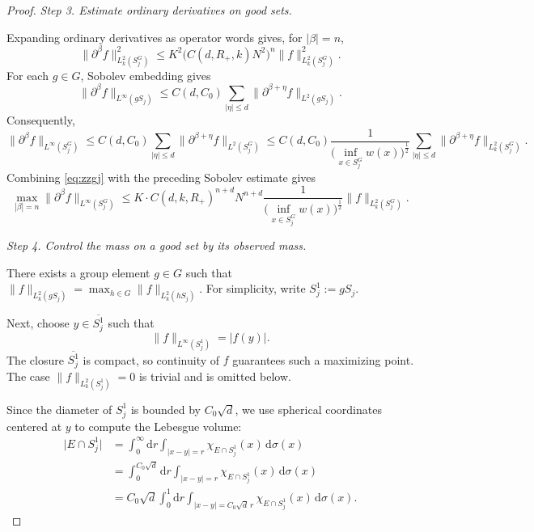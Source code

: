 \documentclass[12pt]{article}
\begin{document}
\begin{proof}
\emph{Step 3. Estimate ordinary derivatives on good sets.}

Expanding ordinary derivatives as operator words gives, for $|\beta|=n$,
\begin{equation}\label{eq:zzgj}
\|\partial^\beta f\|_{L_k^2(S_j^G)}^2 \le K^2\big(C(d,R_+,k)N^2\big)^n \| f\|_{L_k^2(S_j^G)}^2.
\end{equation}
For each $g\in G$, Sobolev embedding gives
\[
\|\partial^\beta f\|_{L^\infty(gS_j)} \le C(d,C_0)\sum_{|\eta|\le d}\|\partial^{\beta+\eta} f\|_{L^2(gS_j)}.
\]
Consequently,
\[
\|\partial^\beta f\|_{L^\infty(S_j^G)} \le C(d,C_0)\sum_{|\eta|\le d}\|\partial^{\beta+\eta} f\|_{L^2(S_j^G)}
\le C(d,C_0)\frac{1}{\big(\inf_{x\in S_j^G} w(x)\big)^{\frac12}}\sum_{|\eta|\le d}\|\partial^{\beta+\eta} f\|_{L_k^2(S_j^G)}.
\]
Combining \eqref{eq:zzgj} with the preceding Sobolev estimate gives
\begin{equation}\label{ESB}
\max_{|\beta|=n}\|\partial^\beta f\|_{L^\infty(S_j^G)} \le K\cdot C(d,k,R_+)^{n+d} N^{n+d}
\frac{1}{\big(\inf_{x\in S_j^G} w(x)\big)^{\frac12}}
\|f\|_{L_k^2(S_j^G)}.
\end{equation}

\emph{Step 4. Control the mass on a good set by its observed mass.}

There exists a group element $g \in G$ such that $\|f\|_{L_k^2(g S_j)} = \max_{h \in G} \|f\|_{L_k^2(h S_j)}$. For simplicity, write $S_j^1 := g S_j$.

Next, choose $y \in \overline{S_j^1}$ such that
\[
\|f\|_{L^\infty(S_j^1)} = |f(y)|.
\]
The closure $\overline{S_j^1}$ is compact, so continuity of $f$ guarantees such a maximizing point. The case $\|f\|_{L_k^2(S_j^1)}=0$ is trivial and is omitted below.

Since the diameter of $S_j^1$ is bounded by $C_0 \sqrt{d}$, we use spherical coordinates centered at $y$ to compute the Lebesgue volume:
\[
\begin{aligned}
\big|E \cap S_j^1\big| &= \int_{0}^{\infty} \mathrm{d}r \int_{|x-y|=r} \chi_{E \cap S_j^1}(x) \, \mathrm{d}\sigma(x) \\
&= \int_{0}^{C_0\sqrt{d}} \mathrm{d}r \int_{|x-y|=r} \chi_{E \cap S_j^1}(x) \, \mathrm{d}\sigma(x) \\
&= C_0\sqrt{d} \int_{0}^{1} \mathrm{d}r \int_{|x-y|=C_0\sqrt{d}\, r} \chi_{E \cap S_j^1}(x) \, \mathrm{d}\sigma(x).
\end{aligned}
\]


\end{proof}
\end{document}
